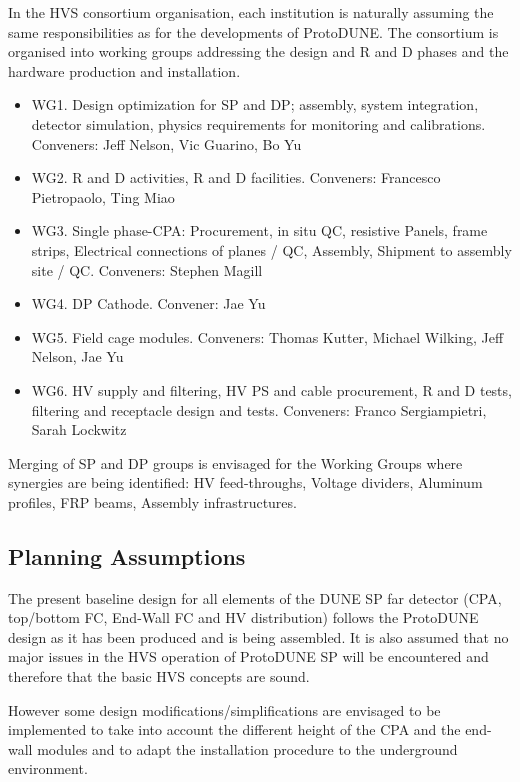 In the HVS consortium organisation, each institution is naturally assuming the same responsibilities as for the developments of ProtoDUNE. The consortium is organised into working groups addressing the design and  R and D phases and the hardware production and installation.

\begin{itemize}
\item WG1. Design optimization for SP and DP; assembly, system integration, detector simulation, physics requirements for monitoring and calibrations. Conveners: Jeff Nelson, Vic Guarino, Bo Yu
\item WG2. R and D activities, R and D facilities. Conveners: Francesco Pietropaolo, Ting Miao
\item WG3. Single phase-CPA: Procurement, in situ QC, resistive Panels, frame strips, Electrical connections of planes / QC, Assembly, Shipment to assembly site / QC. Conveners: Stephen Magill
\item WG4. DP Cathode. Convener: Jae Yu
\item WG5. Field cage modules. Conveners: Thomas Kutter, Michael Wilking, Jeff Nelson, Jae Yu
\item WG6. HV supply and filtering, HV PS and cable procurement, R and D tests, filtering and receptacle design and tests. Conveners: Franco Sergiampietri, Sarah Lockwitz
\end{itemize}

\noindent Merging of SP and DP groups is envisaged for the Working Groups where synergies are being identified: HV feed-throughs, Voltage dividers, Aluminum profiles, FRP beams, Assembly infrastructures.

\subsection{Planning Assumptions}
\label{sec:fddp-hv-org-assmp}
The present baseline design for all elements of the DUNE SP far detector (CPA, top/bottom FC, End-Wall FC and HV distribution) follows the ProtoDUNE design as it has been produced and is being assembled.  It is also assumed that no major issues in the HVS operation of ProtoDUNE SP will be encountered and therefore that the basic HVS concepts are sound.

However some design modifications/simplifications are envisaged to be implemented to take into account the different height of the CPA  and the end-wall modules and to adapt the installation procedure to the underground environment.

